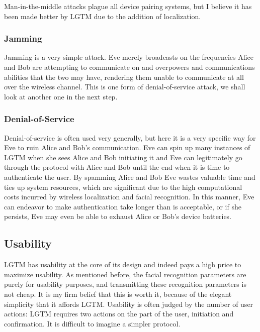 \documentclass[12pt]{report}
\begin{document}
Man-in-the-middle attacks plague all device pairing systems, but I believe it has been made better by LGTM due to the addition of localization. \\

\subsubsection{Jamming}
Jamming is a very simple attack. Eve merely broadcasts on the frequencies Alice and Bob are attempting to communicate on and overpowers and communications abilities that the two may have, rendering them unable to communicate at all over the wireless channel. This is one form of denial-of-service attack, we shall look at another one in the next step.

\subsubsection{Denial-of-Service}
Denial-of-service is often used very generally, but here it is a very specific way for Eve to ruin Alice and Bob's communication. Eve can spin up many instances of LGTM when she sees Alice and Bob initiating it and Eve can legitimately go through the protocol with Alice and Bob until the end when it is time to authenticate the user. By spamming Alice and Bob Eve wastes valuable time and ties up system resources, which are significant due to the high computational costs incurred by wireless localization and facial recognition. In this manner, Eve can endeavor to make authentication take longer than is acceptable, or if she persists, Eve may even be able to exhaust Alice or Bob's device batteries.

\subsection{Usability}
LGTM has usability at the core of its design and indeed pays a high price to maximize usability. As mentioned before, the facial recognition parameters are purely for usability purposes, and transmitting these recognition parameters is not cheap. It is my firm belief that this is worth it, because of the elegant simplicity that it affords LGTM. Usability is often judged by the number of user actions: LGTM requires two actions on the part of the user, initiation and confirmation. It is difficult to imagine a simpler protocol. \\
\end{document}
